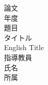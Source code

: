\begin{titlepage}
  \begin{center}
      \vspace{10truept}
      {\Huge 論文} \\
      \vspace{10truept}
      {\LARGE 年度} \\
      \vspace*{180truept}
      {\Large 題目} \\
      \vspace{10truept}
      {\Huge タイトル}  \\
      \vspace{10truept}
      {\LARGE{{English} {Title}}}  \\
      \vspace{160truept}
      {\Large 指導教員}\ {\Large } \\
      \vspace{10truept}
      {\Large 氏名}\ {\Large } \\
      \vspace{80truept}
      {\Large 所属}  
  \end{center}
\end{titlepage}